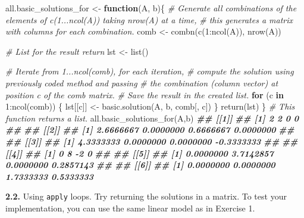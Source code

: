 \documentclass[
]{article}
\newenvironment{Shaded}{\begin{snugshade}}{\end{snugshade}}
\newcommand{\CommentTok}[1]{\textcolor[rgb]{0.56,0.35,0.01}{\textit{#1}}}
\newcommand{\ControlFlowTok}[1]{\textcolor[rgb]{0.13,0.29,0.53}{\textbf{#1}}}
\newcommand{\DecValTok}[1]{\textcolor[rgb]{0.00,0.00,0.81}{#1}}
\newcommand{\DocumentationTok}[1]{\textcolor[rgb]{0.56,0.35,0.01}{\textbf{\textit{#1}}}}
\newcommand{\FunctionTok}[1]{\textcolor[rgb]{0.00,0.00,0.00}{#1}}
\newcommand{\NormalTok}[1]{#1}
\newcommand{\OtherTok}[1]{\textcolor[rgb]{0.56,0.35,0.01}{#1}}
\newcommand{\SpecialCharTok}[1]{\textcolor[rgb]{0.00,0.00,0.00}{#1}}
\begin{document}
\begin{Shaded}
\begin{Highlighting}[]
\NormalTok{all.basic\_solutions\_for }\OtherTok{\textless{}{-}} \ControlFlowTok{function}\NormalTok{(A, b)\{}
  \CommentTok{\# Generate all combinations of the elements of c(1...ncol(A)) taking nrow(A) at a time,}
  \CommentTok{\# this generates a matrix with columns for each combination.}
\NormalTok{  comb }\OtherTok{\textless{}{-}} \FunctionTok{combn}\NormalTok{(}\FunctionTok{c}\NormalTok{(}\DecValTok{1}\SpecialCharTok{:}\FunctionTok{ncol}\NormalTok{(A)), }\FunctionTok{nrow}\NormalTok{(A))}
  
  \CommentTok{\# List for the result return}
\NormalTok{  lst }\OtherTok{\textless{}{-}} \FunctionTok{list}\NormalTok{()}
  
  \CommentTok{\# Iterate from 1...ncol(comb), for each iteration,}
  \CommentTok{\# compute the solution using previously coded method and passing}
  \CommentTok{\# the combination (column vector) at position c of the comb matrix.}
  \CommentTok{\# Save the result in the created list.}
  \ControlFlowTok{for}\NormalTok{ (c }\ControlFlowTok{in} \DecValTok{1}\SpecialCharTok{:}\FunctionTok{ncol}\NormalTok{(comb)) \{}
\NormalTok{    lst[[c]] }\OtherTok{\textless{}{-}} \FunctionTok{basic.solution}\NormalTok{(A, b, comb[, c])}
\NormalTok{  \}}
  \FunctionTok{return}\NormalTok{(lst)}
\NormalTok{\}}
\CommentTok{\# This function returns a list.}
\FunctionTok{all.basic\_solutions\_for}\NormalTok{(A,b)}
\DocumentationTok{\#\# [[1]]}
\DocumentationTok{\#\# [1] 2 2 0 0}
\DocumentationTok{\#\#}
\DocumentationTok{\#\# [[2]]}
\DocumentationTok{\#\# [1] 2.6666667 0.0000000 0.6666667 0.0000000}
\DocumentationTok{\#\#}
\DocumentationTok{\#\# [[3]]}
\DocumentationTok{\#\# [1] 4.3333333  0.0000000  0.0000000 {-}0.3333333}
\DocumentationTok{\#\#}
\DocumentationTok{\#\# [[4]]}
\DocumentationTok{\#\# [1] 0 8 {-}2 0}
\DocumentationTok{\#\#}
\DocumentationTok{\#\# [[5]]}
\DocumentationTok{\#\# [1] 0.0000000 3.7142857 0.0000000 0.2857143}
\DocumentationTok{\#\#}
\DocumentationTok{\#\# [[6]]}
\DocumentationTok{\#\# [1] 0.0000000 0.0000000 1.7333333 0.5333333}
\end{Highlighting}
\end{Shaded}

\textbf{2.2.} Using \texttt{apply} loops. Try returning the solutions in
a matrix. To test your implementation, you can use the same linear model
as in Exercise 1.
\end{document}
